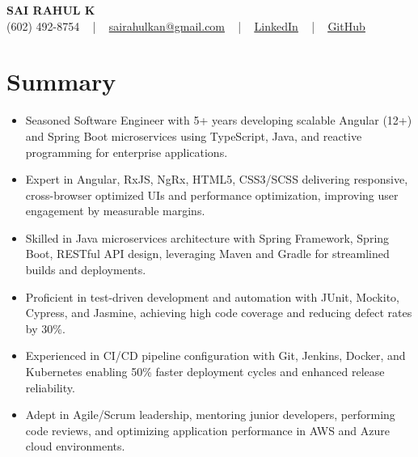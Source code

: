 \documentclass[letterpaper,11pt]{article}
\newcommand{\resumeItem}[1]{
  \item\footnotesize{
    {#1 \vspace{-2pt}}
  }
}
\newcommand{\resumeItemListStart}{\begin{itemize}[leftmargin=*]}
\newcommand{\resumeItemListEnd}{\end{itemize}\vspace{-5pt}}
\begin{document}
\begin{center}
    {\fontsize{14pt}{12pt}\selectfont \textbf{\MakeUppercase{Sai Rahul K}}}\\ \vspace{2pt}
    \fontsize{10pt}{12pt}\selectfont (602) 492-8754 ~ | ~ \href{mailto:sairahulkan@gmail.com}{sairahulkan@gmail.com} ~ | ~
    \href{https://www.linkedin.com/in/rq123/}{\color{blue}\underline{LinkedIn}} ~ | ~
    \href{https://github.com/kanrahuldo}{\color{blue}\underline{GitHub}}~
    \vspace{-8pt}
\end{center}

\section{Summary}
\fontsize{9pt}{10pt}\selectfont
\resumeItemListStart
    \resumeItem{Seasoned Software Engineer with 5+ years developing scalable Angular (12+) and Spring Boot microservices using TypeScript, Java, and reactive programming for enterprise applications.}
    \resumeItem{Expert in Angular, RxJS, NgRx, HTML5, CSS3/SCSS delivering responsive, cross-browser optimized UIs and performance optimization, improving user engagement by measurable margins.}
    \resumeItem{Skilled in Java microservices architecture with Spring Framework, Spring Boot, RESTful API design, leveraging Maven and Gradle for streamlined builds and deployments.}
    \resumeItem{Proficient in test-driven development and automation with JUnit, Mockito, Cypress, and Jasmine, achieving high code coverage and reducing defect rates by 30\%.}
    \resumeItem{Experienced in CI/CD pipeline configuration with Git, Jenkins, Docker, and Kubernetes enabling 50\% faster deployment cycles and enhanced release reliability.}
    \resumeItem{Adept in Agile/Scrum leadership, mentoring junior developers, performing code reviews, and optimizing application performance in AWS and Azure cloud environments.}
\resumeItemListEnd
\vspace{-6pt}
\end{document}

